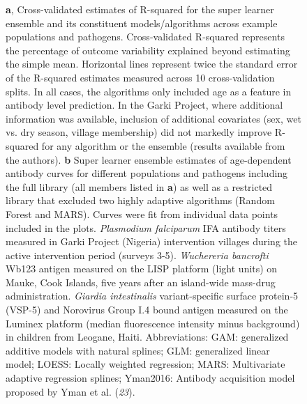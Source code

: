 \documentclass[11pt]{article}
\begin{document}
\begin{landscape}
\begin{figure}[htbp]
\begin{center}
\begin{minipage}{1.3\textwidth}
\caption{\textbf{a}, Cross-validated estimates of R-squared for the super learner ensemble and its constituent models/algorithms across example populations and pathogens. Cross-validated R-squared represents the percentage of outcome variability explained beyond estimating the simple mean. Horizontal lines represent twice the standard error of the R-squared estimates measured across 10 cross-validation splits. In all cases, the algorithms only included age as a feature in antibody level prediction. In the Garki Project, where additional information was available, inclusion of additional covariates (sex, wet vs. dry season, village membership) did not markedly improve R-squared for any algorithm or the ensemble (results available from the authors).
\textbf{b} Super learner ensemble  estimates of age-dependent antibody curves for different populations and pathogens including the full library (all members listed in \textbf{a}) as well as a restricted library that excluded two highly adaptive algorithms (Random Forest and MARS). Curves were fit from individual data points included in the plots. 
\textit{Plasmodium falciparum} IFA antibody titers measured in Garki Project (Nigeria) intervention villages during the active intervention period (surveys 3-5). \textit{Wuchereria bancrofti} Wb123 antigen measured on the LISP platform (light units) on Mauke, Cook Islands, five years after an island-wide mass-drug administration. \textit{Giardia intestinalis} variant-specific surface protein-5 (VSP-5) and Norovirus Group I.4 bound antigen measured on the Luminex platform (median fluorescence intensity minus background) in children from Leogane, Haiti.
Abbreviations: GAM: generalized additive models with natural splines; GLM: generalized linear model; LOESS: Locally weighted regression; MARS: Multivariate adaptive regression splines; Yman2016: Antibody acquisition model proposed by Yman et al. (\textit{23}).}
\label{fig:CVSL}
\end{minipage}
\end{center}
\end{figure}
\end{landscape}




%
\end{document}
